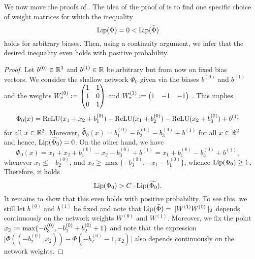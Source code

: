 We now move the proofs of .
The idea of the proof of  is to find one specific choice of weight matrices for which the inequality
\begin{equation*}
\operatorname{Lip}(\Phi) =  0 < \operatorname{Lip}(\widetilde{\Phi})
\end{equation*}
holds for arbitrary biases. Then, using a continuity argument, we infer that the desired inequality even holds with positive probability.
\renewcommand*{\proofname}{Proof of \Cref{prop:Cbound}}
\begin{proof}
Let $b^{(0)} \in \mathbb{R}^3$ and $b^{(1)} \in \mathbb{R}$ be arbitrary but from now on fixed bias vectors. 
We consider the shallow network $\Phi_0$ given via the biases $b^{(0)}$ and $b^{(1)}$ and the weights $W^{(0)}_\ast \mathrel{\mathop:}= \begin{pmatrix} 1 & 1\\ 1 & 0 \\ 0 & 1\end{pmatrix}$ and $W^{(1)}_\ast \mathrel{\mathop:}= \begin{pmatrix} 1 & -1 & - 1\end{pmatrix}$ . 
This implies
\begin{equation*}
\Phi_0(x) = \operatorname{ReLU}(x_1 + x_2+b^{(0)}_1) - \operatorname{ReLU}(x_1 + b^{(0)}_2) - \operatorname{ReLU}(x_2 + b^{(0)}_3) + b^{(1)}
\end{equation*}
for all $x \in \mathbb{R}^2$. 
Moreover, $\widetilde{\Phi_0}(x) = b^{(0)}_1 - b^{(0)}_2  - b^{(0)}_3+ b^{(1)}$ for all $x \in \mathbb{R}^2$ and hence, $\operatorname{Lip}(\widetilde{\Phi_0}) = 0$. 
On the other hand, we have
\begin{equation*}
\Phi_0(x) = x_1 + x_2 + b^{(0)}_1 - x_2 - b^{(0)}_3 +b^{(1)}= x_1 + b^{(0)}_1 - b^{(0)}_3 + b^{(1)},
\end{equation*}
whenever $x_1 \leq - b^{(0)}_2$, and $x_2 \geq \max\{- b^{(0)}_3, - x_1 - b^{(0)}_1\}$,  
whence $\operatorname{Lip}(\Phi_0) \geq 1$. Therefore, it holds
\begin{equation*}
\operatorname{Lip}(\Phi_0) > C \cdot \operatorname{Lip}(\widetilde{\Phi_0}).
\end{equation*}
It remains to show that this even holds with positive probability. 
To see this, we still let $b^{(0)}$ and $b^{(1)}$ be fixed and note that $\operatorname{Lip}(\widetilde{\Phi}) = \Vert W^{(1)} W^{(0)} \Vert_2$ depends continuously on the network weights $W^{(0)}$ and $W^{(1)}$. 
Moreover, we fix the point $x_2 \mathrel{\mathop:}= \max\{- b^{(0)}_3, -b^{(0)}_1 + b^{(0)}_2 + 1\}$ and note that the expression $\vert \Phi((-b^{(0)}_2, x_2)) - \Phi(-b^{(0)}_2 - 1, x_2) \vert$ also depends continuously on the network weights. 

\end{proof}
